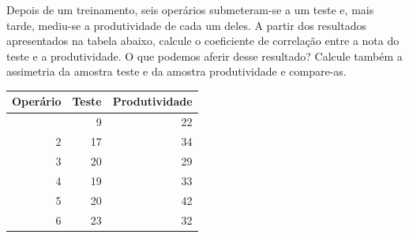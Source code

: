 \documentclass[11pt]{article}
\begin{document}
    Depois de um treinamento, seis operários submeteram-se a um teste e,
mais tarde, mediu-se a produtividade de cada um deles. A partir dos
resultados apresentados na tabela abaixo, calcule o coeficiente de
correlação entre a nota do teste e a produtividade. O que podemos aferir
desse resultado? Calcule também a assimetria da amostra teste e da
amostra produtividade e compare-as.

{\def\LTcaptype{none} %
\begin{longtable}[]{@{}rrr@{}}
\toprule\noalign{}
Operário & Teste & Produtividade \\
\midrule\noalign{}
\endhead
\bottomrule\noalign{}
\endlastfoot
1 & 9 & 22 \\
2 & 17 & 34 \\
3 & 20 & 29 \\
4 & 19 & 33 \\
5 & 20 & 42 \\
6 & 23 & 32 \\
\end{longtable}
}
\end{document}
